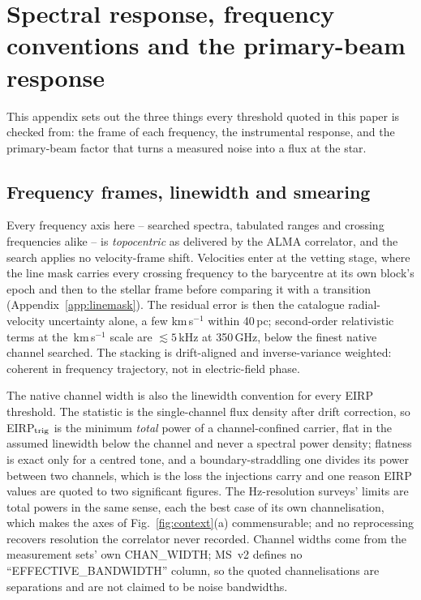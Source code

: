 \section{Spectral response, frequency conventions and the primary-beam
response}
\label{app:conventions}

This appendix sets out the three things every threshold quoted in this paper
is checked from: the frame of each frequency, the instrumental response, and
the primary-beam factor that turns a measured noise into a flux at the star.


\subsection{Frequency frames, linewidth and smearing}

Every frequency axis here -- searched spectra, tabulated ranges and
crossing frequencies alike -- is \emph{topocentric} as delivered by the
ALMA correlator, and the search applies no velocity-frame shift.
Velocities enter at the vetting stage, where the line mask carries every
crossing frequency to the barycentre at its own block's epoch and then to the
stellar frame before comparing it with a transition
(Appendix~\ref{app:linemask}). The residual error is then the catalogue
radial-velocity uncertainty alone, a few km\,s$^{-1}$ within 40\,pc;
second-order relativistic terms at the \MaskHalfKms\,km\,s$^{-1}$
scale are $\lesssim5$\,kHz at 350\,GHz, below the finest native channel
searched. The stacking is drift-aligned and inverse-variance weighted:
coherent in frequency trajectory, not in electric-field phase.

The native channel width is also the linewidth convention for every EIRP
threshold. The statistic is the single-channel flux density after drift
correction, so EIRP$_{\rm trig}$ is the minimum \emph{total} power of a
channel-confined carrier, flat in the assumed linewidth below the channel and
never a spectral power density; flatness is exact only for a centred tone,
and a boundary-straddling one divides its power between two channels, which
is the loss the injections carry and one reason EIRP values are quoted to two
significant figures. The Hz-resolution
surveys' limits are total powers in the same sense, each the best case of
its own channelisation, which makes the axes of Fig.~\ref{fig:context}(a)
commensurable; and no reprocessing recovers resolution the correlator never
recorded. Channel widths come from the measurement sets' own CHAN\_WIDTH;
MS~v2 defines no ``EFFECTIVE\_BANDWIDTH'' column, so the quoted
channelisations are separations and are not claimed to be noise bandwidths.

